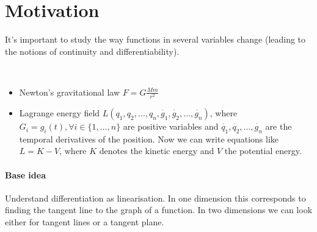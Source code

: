 \section{Motivation}
It's important to study the way functions in several variables change (leading to the notions of continuity and differentiability). 
\begin{exam}\ 
 \begin{itemize}
  \item Newton's gravitational law $F=G\frac{Mm}{r^2}$
  \item Lagrange energy field $L(q_1, q_2,\ldots, q_n, \dot{g_1}, \dot{g_2}, \ldots, \dot{g_n})$, where $G_i=g_i(t), \forall i\in\{1, \ldots, n\}$ are positive variables and $\dot{q_1}, \dot{q_2}, \ldots, \dot{g_n}$ are the temporal derivatives of the position. Now we can write equations like $L=K-V$, where $K$ denotes the kinetic energy and $V$ the potential energy. 
 \end{itemize}
\end{exam}
\paragraph{Base idea}
Understand differentiation as linearisation. In one dimension this corresponds to finding the tangent line to the graph of a function. In two dimensions we can look either for tangent lines or a tangent plane. 
